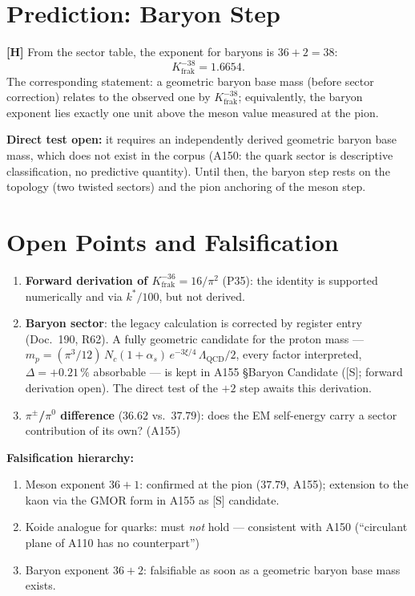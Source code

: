 \section{Prediction: Baryon Step}

\textbf{[H]} From the sector table, the exponent for baryons is
$36+2 = 38$:
\[
  K_\text{frak}^{-38} = 1{.}6654.
\]
The corresponding statement: a geometric baryon base mass (before
sector correction) relates to the observed one by
$K_\text{frak}^{-38}$; equivalently, the baryon exponent lies exactly
one unit above the meson value measured at the pion.

\textbf{Direct test open:} it requires an independently derived
geometric baryon base mass, which does not exist in the corpus (A150:
the quark sector is descriptive classification, no predictive
quantity). Until then, the baryon step rests on the topology (two
twisted sectors) and the pion anchoring of the meson step.

\section{Open Points and Falsification}

\begin{enumerate}
\item \textbf{Forward derivation of $K_\text{frak}^{-36} = 16/\pi^2$}
  (P35): the identity is supported numerically and via $k^*/100$, but
  not derived.
\item \textbf{Baryon sector}: the legacy calculation is corrected by
  register entry (Doc.~190, R62). A fully geometric candidate for the
  proton mass ---
  $m_p = (\pi^3/12)\,N_c(1+\alpha_s)\,e^{-3\xi/4}\,\Lambda_\text{QCD}/2$,
  every factor interpreted, $\Delta=+0{.}21\,\%$ absorbable --- is kept
  in A155 \S{}Baryon Candidate ([S]; forward derivation open). The
  direct test of the $+2$ step awaits this derivation.
\item \textbf{$\pi^\pm$/$\pi^0$ difference} ($36{.}62$ vs.\ $37{.}79$):
  does the EM self-energy carry a sector contribution of its own?
  (A155)
\end{enumerate}

\textbf{Falsification hierarchy:}
\begin{enumerate}
\item Meson exponent $36+1$: confirmed at the pion ($37{.}79$, A155);
  extension to the kaon via the GMOR form in A155 as [S] candidate.
\item Koide analogue for quarks: must \emph{not} hold --- consistent
  with A150 (``circulant plane of A110 has no counterpart'')
  \checkmark
\item Baryon exponent $36+2$: falsifiable as soon as a geometric
  baryon base mass exists.
\end{enumerate}

